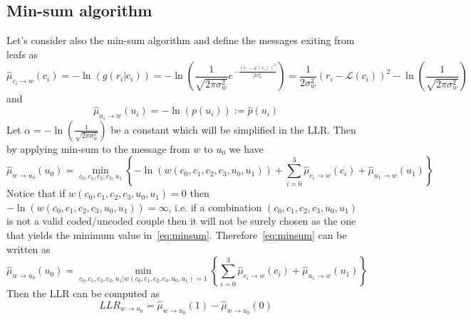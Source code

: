\documentclass[10pt]{article}
\begin{document}
\subsection*{Min-sum algorithm}
Let's consider also the min-sum algorithm and define the messages exiting from leafs as
\begin{equation}
	\hat{\mu}_{c_i \rightarrow w}(c_i) = -\ln(g(r_i|c_i)) = -\ln\left(\frac{1}{\sqrt{2\pi \sigma_w^2}} e^{-\frac{(r_i - \mathcal{L}(c_i))^2}{2\sigma_w^2}}\right) = \frac{1}{2\sigma_w^2}(r_i - \mathcal{L}(c_i))^2 - \ln\left(\frac{1}{\sqrt{2\pi \sigma_w^2}}\right)
\end{equation}
and
\begin{equation}
	\hat{\mu}_{u_i \rightarrow w}(u_i) = -\ln(p(u_i)) := \hat{p}(u_i) 
\end{equation}
Let $\alpha = - \ln\left(\frac{1}{\sqrt{2\pi \sigma_w^2}}\right)$ be a constant which will be simplified in the LLR. Then by applying min-sum to the message from $w$ to $u_0$ we have
\begin{equation}\label{eq:minsum}
	\hat{\mu}_{w \rightarrow u_0}(u_0) = \min_{c_0, c_1, c_2, c_3, u_1} 
		\left\{
			-\ln(w(c_0, c_1, c_2, c_3, u_0, u_1)) + 
			\sum_{i=0}^{3} \hat{\mu}_{c_i \rightarrow w}(c_i) + \hat{\mu}_{u_1 \rightarrow w}(u_1)
		\right\}
\end{equation}
Notice that if $w(c_0, c_1, c_2, c_3, u_0, u_1) = 0$ then $-\ln(w(c_0, c_1, c_2, c_3, u_0, u_1)) = \infty$, i.e. if a combination $(c_0, c_1, c_2, c_3, u_0, u_1)$ is not a valid coded/uncoded couple then it will not be surely chosen as the one that yields the minimum value in~\eqref{eq:minsum}. Therefore~\eqref{eq:minsum} can be written as
\begin{equation}\label{eq:minsum2}
	\hat{\mu}_{w \rightarrow u_0}(u_0) = \min_{c_0, c_1, c_2, c_3, u_1 | w(c_0, c_1, c_2, c_3, u_0, u_1) = 1} 
		\left\{
			\sum_{i=0}^{3} \hat{\mu}_{c_i \rightarrow w}(c_i) + \hat{\mu}_{u_1 \rightarrow w}(u_1)
		\right\}
\end{equation}
Then the LLR can be computed as
\begin{equation}
	LLR_{w \rightarrow u_0} = \hat{\mu}_{w \rightarrow u_0}(1) - \hat{\mu}_{w \rightarrow u_0}(0)
\end{equation}
\end{document}
